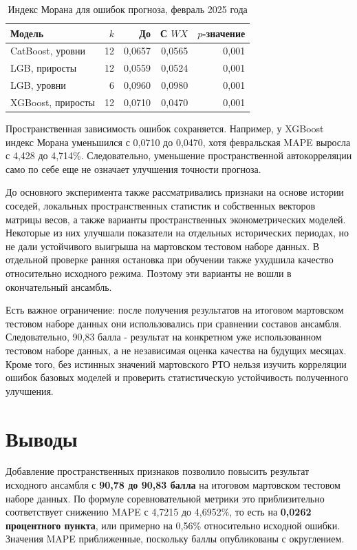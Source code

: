 \documentclass[12pt, a4paper]{article}
\newcommand{\tablesourcetext}[1]{\par\vspace{1mm}{\footnotesize Источник: #1.}}
\begin{document}
\begin{table}[H]
\centering
\footnotesize
\caption{Индекс Морана для ошибок прогноза, февраль 2025 года}
\begin{tabularx}{\textwidth}{Xrrrr}\toprule
Модель & $k$ & До & С $WX$ & $p$-значение\\\midrule
CatBoost, уровни & 12 & 0,0657 & 0,0565 & 0,001 \\
LGB, приросты & 12 & 0,0559 & 0,0524 & 0,001 \\
LGB, уровни & 6 & 0,0960 & 0,0980 & 0,001 \\
XGBoost, приросты & 12 & 0,0710 & 0,0470 & 0,001 \\
\bottomrule\end{tabularx}
\tablesourcetext{расчеты авторов по данным X5 Group и GeoNames}
\end{table}

Пространственная зависимость ошибок сохраняется. Например, у XGBoost индекс Морана уменьшился с 0,0710 до 0,0470,
хотя февральская MAPE выросла с 4,428 до 4,714\%. Следовательно, уменьшение пространственной автокорреляции само по себе
еще не означает улучшения точности прогноза.

До основного эксперимента также рассматривались признаки на основе истории соседей, локальных пространственных статистик
и собственных векторов матрицы весов, а также варианты пространственных эконометрических моделей.
Некоторые из них улучшали показатели на отдельных исторических периодах, но не дали устойчивого выигрыша на мартовском тестовом наборе данных.
В отдельной проверке ранняя остановка при обучении также ухудшила качество относительно исходного режима.
Поэтому эти варианты не вошли в окончательный ансамбль.

Есть важное ограничение: после получения результатов на итоговом мартовском тестовом наборе данных они использовались при сравнении составов ансамбля.
Следовательно, 90,83 балла - результат на конкретном уже использованном тестовом наборе данных, а не независимая оценка качества на будущих месяцах.
Кроме того, без истинных значений мартовского РТО нельзя изучить корреляции ошибок базовых моделей и проверить статистическую
устойчивость полученного улучшения.

\section*{Выводы}

Добавление пространственных признаков позволило повысить результат исходного ансамбля с \textbf{90,78 до 90,83 балла}
на итоговом мартовском тестовом наборе данных. По формуле соревновательной метрики это приблизительно соответствует снижению MAPE с 4,7215 до 4,6952\%,
то есть на \textbf{0,0262 процентного пункта}, или примерно на 0,56\% относительно исходной ошибки.
Значения MAPE приближенные, поскольку баллы опубликованы с округлением.
\end{document}
